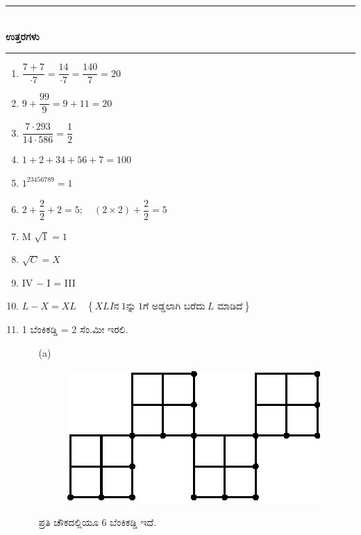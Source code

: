 \medskip

\begin{center}
\rule{5cm}{1pt}\\[3pt]
{\Large\bfseries ಉತ್ತರಗಳು}\\[-0.1cm]
\rule{5cm}{1pt}
\end{center}

\begin{enumerate}
\itemsep=5pt

\item $\dfrac{7+7}{\cdot 7} = \dfrac{14}{\cdot 7} = \dfrac{140}{7} = 20$

\item $9 + \dfrac{99}{9} = 9 + 11 = 20$

\item $\dfrac{7\cdot 293}{14\cdot 586} = \dfrac{1}{2}$

\item $1+2+34+56+7 = 100$

\item $1^{23456789} = 1$

\item $2 + \dfrac{2}{2} + 2 = 5;\quad (2 \times 2)  + \dfrac{2}{2} = 5$

\item M \qquad $\sqrt{1} = 1$

\item $\sqrt{C} = X$

\item IV $-$ I = III

\item $L - X = XL\quad \left\{XLI \text{ನ} ~1 \text{ನ್ನು} ~1 \text{ಗೆ ಅಡ್ಡಲಾಗಿ ಬರೆದು} ~L \text{ ಮಾಡಿದೆ} \right\}$


\item 1 ಬೆಂಕಿಕಡ್ಡಿ = 2 ಸೆಂ.ಮೀ ಇರಲಿ. 

\begin{itemize}
\item[(a)] 
~

\begin{minipage}[c]{5cm}
\begin{figure}[H]
\centering
\includegraphics{images/chap7/ans11a.eps}
\end{figure}
\end{minipage}
\begin{minipage}[c]{4cm}
ಪ್ರತಿ ಚೌಕದಲ್ಲಿಯೂ 6 ಬೆಂಕಿಕಡ್ಡಿ ಇದೆ. 


\end{minipage}
\end{itemize}
\end{enumerate}
